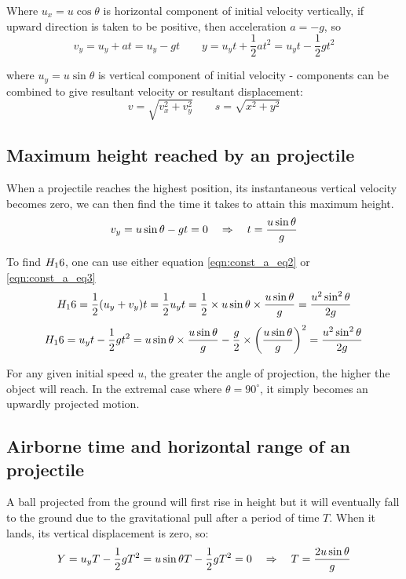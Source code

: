 Where $u_x = u\cos\theta$ is horizontal component of initial velocity vertically, if upward direction is taken to be positive, then acceleration $a=-g$, so
\begin{equation*}
v_y = u_y + at = u_y - gt  \qquad y = u_y t + \frac{1}{2}at^2 = u_y t - \frac{1}{2}gt^2
\end{equation*}

where $u_y = u\sin\theta$ is vertical component of initial velocity - components can be combined to give resultant velocity or resultant displacement:
\begin{equation*}
 v = \sqrt{v_x^2 + v_y^2} \qquad s = \sqrt{x^2 + y^2}
\end{equation*}


\subsection*{Maximum height reached by an projectile}

When a projectile reaches the highest position, its instantaneous vertical velocity becomes zero, we can then find the time it takes to attain this maximum height.
\begin{equation*}
	v_y = u\sin\theta - gt = 0 \quad \Rightarrow \quad t = \frac{u\sin\theta}{g}
\end{equation*}
	
To find $H_16$, one can use either equation \eqref{eqn:const_a_eq2} or \eqref{eqn:const_a_eq3} 
	\begin{equation*}
	H_16 = \frac{1}{2}(u_y+v_y) t = \frac{1}{2}u_y t = \frac{1}{2} \times u \sin\theta \times \frac{u\sin\theta}{g} = \frac{u^2 \sin^2\theta}{2g}
	\end{equation*}
	\begin{equation*}
	H_16 = u_y t - \frac{1}{2}gt^2 = u \sin\theta \times \frac{u\sin\theta}{g} - \frac{g}{2} \times \left(\frac{u\sin\theta}{g}\right)^2 = \frac{u^2 \sin^2\theta}{2g}
	\end{equation*}

For any given initial speed $u$, the greater the angle of projection, the higher the object will reach. In the extremal case where $\theta = 90 ^\circ$, it simply becomes an upwardly projected motion.

\subsection*{Airborne time and horizontal range of an projectile}

A ball projected from the ground will first rise in height but it will eventually fall to the ground due to the gravitational pull after a period of time $T$. When it lands, its vertical displacement is zero, so:
	\begin{equation*}
	Y = u_y T - \frac{1}{2}gT^2 = u \sin \theta T - \frac{1}{2}gT^2 = 0 \quad \Rightarrow \quad T = \frac{2u\sin\theta}{g}
	\end{equation*}
	
